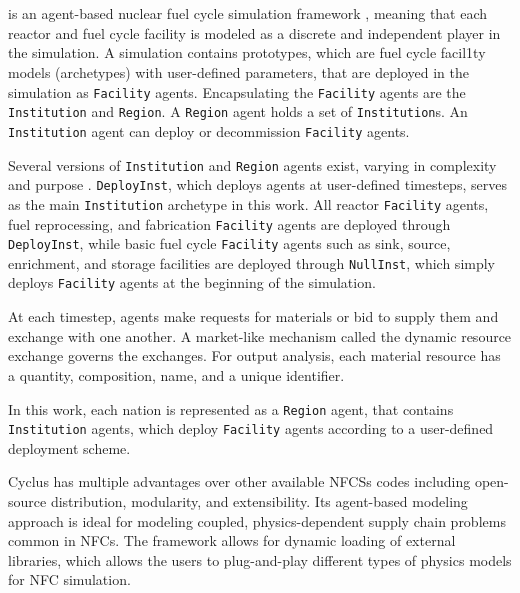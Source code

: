 \section{\Cyclus}

\Cyclus is an agent-based nuclear fuel cycle simulation framework 
\cite{huff_fundamental_2016}, meaning
that each reactor and fuel cycle facility is modeled as a discrete and independent
player in the simulation.
A \Cyclus simulation contains prototypes, which are fuel cycle facil1ty models (archetypes) with
user-defined parameters, that are deployed in the simulation as \texttt{Facility} agents.
Encapsulating the \texttt{Facility} agents are the \texttt{Institution} and \texttt{Region}.
A \texttt{Region} agent holds a set of \texttt{Institution}s. 
An \texttt{Institution} agent can deploy or decommission \texttt{Facility} agents.

Several versions of \texttt{Institution}
and \texttt{Region} agents exist, varying in complexity and purpose \cite{huff_extensions_2014}.
\texttt{DeployInst}, which deploys agents at user-defined timesteps, serves
as the main \texttt{Institution} archetype in this work. All reactor \texttt{Facility} agents,
fuel reprocessing, and fabrication \texttt{Facility} agents
are deployed through \texttt{DeployInst}, while basic fuel cycle \texttt{Facility} agents
such as sink, source, enrichment, and storage facilities are deployed 
through \texttt{NullInst}, which simply deploys \texttt{Facility}
agents at the beginning of the simulation.

At each timestep,
agents make requests for materials or bid to supply them and exchange
with one another. A market-like mechanism called the dynamic resource exchange
\cite{gidden_agent-based_2015} governs the exchanges.
For output analysis, each material resource has a quantity, composition, name, and a unique identifier.

In this work, each nation is represented as a \texttt{Region} agent,
that contains \texttt{Institution} agents, which deploy \texttt{Facility} 
agents according to a user-defined deployment scheme.

Cyclus has multiple advantages over other available
\glspl{NFCS} codes including open-source distribution, modularity,
and extensibility. Its agent-based modeling approach
is ideal for modeling coupled, physics-dependent
supply chain problems common in \glspl{NFC}.
The framework allows for dynamic loading of 
external libraries, which allows the users to plug-and-play
different types of physics models for \gls{NFC}
simulation.

